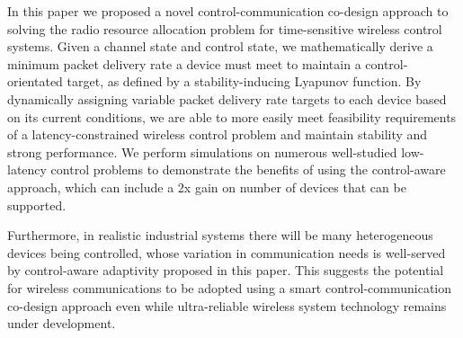 In this paper we proposed a novel control-communication co-design approach to solving the radio resource
allocation problem for time-sensitive wireless control systems. Given a channel state and control state, we mathematically derive a minimum packet delivery
rate a device must meet to maintain a control-orientated target,
as defined by a stability-inducing Lyapunov function. By
dynamically assigning variable packet delivery rate targets
to each device based on its current conditions, we are able to
more easily meet feasibility requirements of a latency-constrained
wireless control problem and maintain stability
and strong performance. We perform simulations on numerous
well-studied low-latency control problems to demonstrate the
benefits of using the control-aware approach, which can include
a 2x gain on number of devices that can be supported. 

 Furthermore, in realistic industrial systems there will be many heterogeneous devices being controlled, whose variation in communication needs is well-served by control-aware adaptivity proposed in this paper. This suggests the potential for wireless communications to be adopted using a smart control-communication co-design approach even
while ultra-reliable wireless system technology remains under development.